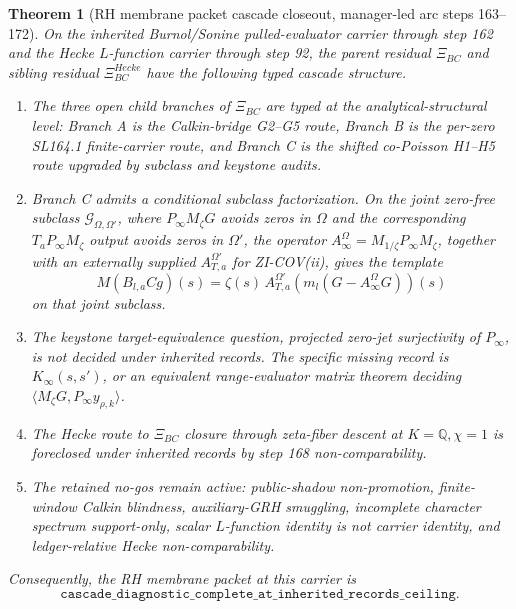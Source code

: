 \documentclass[11pt]{article}
\newtheorem{theorem}{Theorem}
\begin{document}
\begin{theorem}[RH membrane packet cascade closeout, manager-led arc steps 163--172]
On the inherited Burnol/Sonine pulled-evaluator carrier through step 162 and the Hecke \(L\)-function carrier through step 92, the parent residual \(\Xi_{BC}\) and sibling residual \(\Xi_{BC}^{Hecke}\) have the following typed cascade structure.

\begin{enumerate}[label=(\roman*)]
\item The three open child branches of \(\Xi_{BC}\) are typed at the analytical-structural level: Branch A is the Calkin-bridge G2--G5 route, Branch B is the per-zero SL164.1 finite-carrier route, and Branch C is the shifted co-Poisson H1--H5 route upgraded by subclass and keystone audits.

\item Branch C admits a conditional subclass factorization. On the joint zero-free subclass \(\mathcal G_{\Omega,\Omega'}\), where \(P_\infty M_\zeta G\) avoids zeros in \(\Omega\) and the corresponding \(T_aP_\infty M_\zeta\) output avoids zeros in \(\Omega'\), the operator \(A_\infty^\Omega=M_{1/\zeta}P_\infty M_\zeta\), together with an externally supplied \(A_{T,a}^{\Omega'}\) for ZI-COV(ii), gives the template
\[
M(B_{l,a}Cg)(s)=
\zeta(s)\,
A_{T,a}^{\Omega'}\!\left(m_l(G-A_\infty^\Omega G)\right)(s)
\]
on that joint subclass.

\item The keystone target-equivalence question, projected zero-jet surjectivity of \(P_\infty\), is not decided under inherited records. The specific missing record is \(K_\infty(s,s')\), or an equivalent range-evaluator matrix theorem deciding \(\langle M_\zeta G,P_\infty y_{\rho,k}\rangle\).

\item The Hecke route to \(\Xi_{BC}\) closure through zeta-fiber descent at \(K=\mathbb Q,\chi=1\) is foreclosed under inherited records by step 168 non-comparability.

\item The retained no-gos remain active: public-shadow non-promotion, finite-window Calkin blindness, auxiliary-GRH smuggling, incomplete character spectrum support-only, scalar \(L\)-function identity is not carrier identity, and ledger-relative Hecke non-comparability.
\end{enumerate}

Consequently, the RH membrane packet at this carrier is
\[
\texttt{cascade\_diagnostic\_complete\_at\_inherited\_records\_ceiling}.
\]
\end{theorem}
\end{document}
